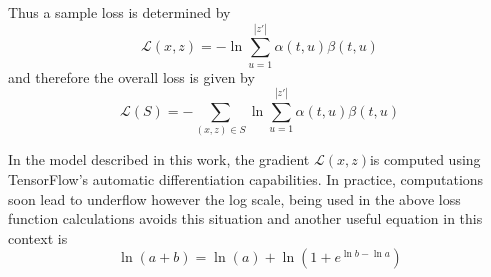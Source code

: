 Thus a sample loss is determined by
\begin{equation}
\mathcal{L}(x, z) = - \ln \sum_{u = 1}^{|z'|} \alpha(t, u) \beta(t, u)\label{eqn_c3_ctc16}
\end{equation}
and therefore the overall loss is given by
\begin{equation}\mathcal{L}(S) = -\sum_{(x,z) \in S} \ln \sum_{u = 1}^{|z'|} \alpha(t, u) \beta(t, u)
\label{eqn_c3_ctc17}\end{equation}

In the model described in this work, the gradient $\mathcal{L}(x, z)$is computed using TensorFlow's automatic differentiation capabilities. In practice, computations soon lead to underflow however the log scale, being used in the above loss function calculations avoids this situation and another useful equation in this context is
\begin{equation}
\ln(a + b) = \ln(a) + \ln(1 + e^{\ln b - \ln a})
\label{eqn_c3_ctc18}\end{equation}
